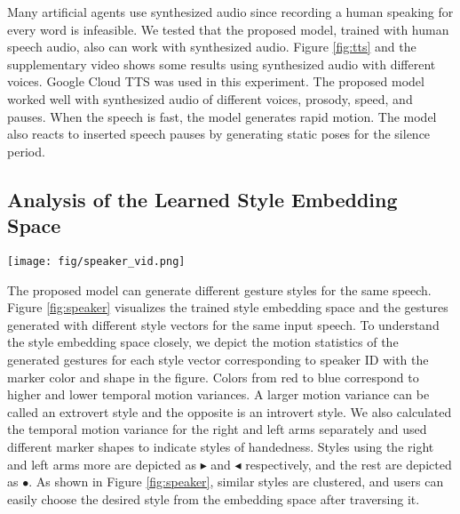\documentclass[acmtog]{acmart}
\begin{document}
Many artificial agents use synthesized audio since recording a human speaking for every word is infeasible. We tested that the proposed model, trained with human speech audio, also can work with synthesized audio. Figure \ref{fig:tts} and the supplementary video shows some results using synthesized audio with different voices. Google Cloud TTS \cite{googletts} was used in this experiment. The proposed model worked well with synthesized audio of different voices, prosody, speed, and pauses. When the speech is fast, the model generates rapid motion. The model also reacts to inserted speech pauses by generating static poses for the silence period. 
  
\subsection{Analysis of the Learned Style Embedding Space} \label{section:speaker_embed}

\begin{figure*}
  \centering
  \texttt{[image: fig/speaker\_vid.png]}
  \caption{Visualization of the style embedding space and sample generation results for the different style vectors. All speaker identities are mapped to style feature vectors $f^\textrm{style}$, and we visualize the feature vectors in two dimensions by using UMAP \cite{mcinnes2018umap}. The points represent degrees of motion variance via color and degree of handedness by its marker types. We labeled the sampled style vectors according to the overall motion variance and handedness as `IB' for the introvert style of moving both hands similarly, `ER' for the extrovert style of moving the right hand more, and so on. All gesture results are generated from the same speech.}
  \label{fig:speaker}
\end{figure*} 
The proposed model can generate different gesture styles for the same speech. Figure \ref{fig:speaker} visualizes the trained style embedding space and the gestures generated with different style vectors for the same input speech. To understand the style embedding space closely, we depict the motion statistics of the generated gestures for each style vector corresponding to speaker ID with the marker color and shape in the figure. Colors from red to blue correspond to higher and lower temporal motion variances. A larger motion variance can be called an extrovert style and the opposite is an introvert style. We also calculated the temporal motion variance for the right and left arms separately and used different marker shapes to indicate styles of handedness. Styles using the right and left arms more are depicted as $\blacktriangleright$ and $\blacktriangleleft$ respectively, and the rest are depicted as $\bullet$. As shown in Figure \ref{fig:speaker}, similar styles are clustered, and users can easily choose the desired style from the embedding space after traversing it.
\end{document}

